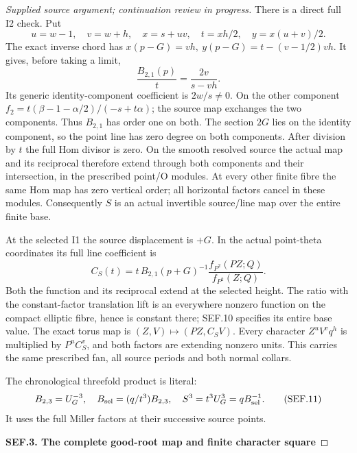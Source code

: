 \begin{proof}[Supplied source argument; continuation review in progress]
There is a direct full I2 check. Put
\[
 u=w-1,\quad v=w+h,\quad x=s+uv,\quad
 t=xh/2,\quad y=x(u+v)/2.
 \tag{SEF.8}
\]
The exact inverse chord has
\(x(p-G)=vh,\ y(p-G)=t-(v-1/2)vh\). It gives, before taking a limit,
\[
                    \frac{B_{2,1}(p)}t=\frac{2v}{s-vh}.
 \tag{SEF.9}
\]
Its generic identity-component coefficient is \(2w/s\ne0\).
On the other component \(f_2=t(\beta-1-\alpha/2)/(-s+t\alpha)\);
the source map exchanges the two components. Thus \(B_{2,1}\)
has order one on both. The section \(2G\) lies on the identity
component, so the point line has zero degree on both components.
After division by \(t\) the full Hom divisor is zero. On the smooth
resolved source the actual map and its reciprocal therefore extend
through both components and their intersection, in the prescribed
point/O modules. At every other finite fibre the same Hom map has
zero vertical order; all horizontal factors cancel in these modules.
Consequently \(S\) is an actual invertible source/line map over the
entire finite base.

At the selected I1 the source displacement is \(+G\). In the actual
point-theta coordinates its full line coefficient is
\[
 C_S(t)=
 t\,B_{2,1}(p+G)^{-1}
       \frac{f_{P^2}(PZ;Q)}{f_{P^2}(Z;Q)}.
 \tag{SEF.10}
\]
Both the function and its reciprocal extend at the selected height.
The ratio with the constant-factor translation lift is an everywhere
nonzero function on the compact elliptic fibre, hence is constant
there; SEF.10 specifies its entire base value. The exact torus map is
\((Z,V)\mapsto(PZ,C_S V)\). Every character
\(Z^uV^vq^h\) is multiplied by \(P^uC_S^v\), and both factors are
extending nonzero units. This carries the same prescribed fan, all
source periods and both normal collars.

The chronological threefold product is literal:
\[
 B_{2,3}=U_G^{-3},\quad
 B_{\rm sel}=(q/t^3)B_{2,3},\quad
 S^3=t^3U_G^3=q B_{\rm sel}^{-1}.
 \tag{SEF.11}
\]
It uses the full Miller factors at their successive source points.

\par

\medskip\noindent\textbf{SEF.3. The complete good-root map and finite character square}

\par\nobreak


\end{proof}

